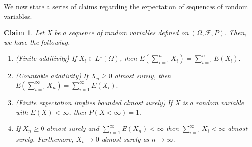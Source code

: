 \documentclass[twoside]{article}
\newtheorem{claim}[theorem]{Claim}
\begin{document}
We now state a series of claims regarding the expectation of sequences of random variables.
\begin{claim}Let X be a sequence of random variables defined on $(\Omega, \mathcal{F}, P).$ Then, we have the following.
\begin{enumerate}
\item (Finite additivity) If $X_i \in L^1(\Omega)$, then $E(\sum_{i=1}^{n}X_i) = \sum_{i=1}^{n}E(X_i).$
\item (Countable additivity) If $X_n \geq 0$ almost surely, then $E(\sum_{i=1}^{\infty}X_n) = \sum_{i=1}^{\infty}E(X_i).$
\item (Finite expectation implies bounded almost surely) If X is a random variable with $E(X) < \infty$, then $P(X < \infty) = 1.$
\item If $X_n \geq 0$ almost surely and $\sum_{i=1}^{\infty}E(X_n) < \infty$ then $\sum_{i=1}^{\infty}X_i < \infty$ almost surely. Furthemore, $X_n \rightarrow 0$ almost surely as $n \rightarrow \infty.$
\end{enumerate}
\end{claim}
\end{document}
